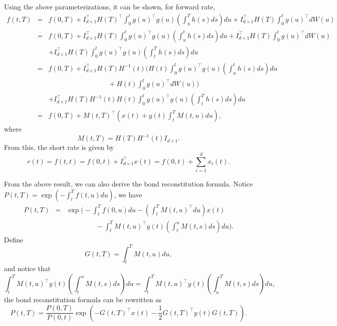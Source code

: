 \documentclass[12pt]{article}
\begin{document}
  Using the above parameterizations, it can be shown, for forward rate,
  \begin{eqnarray}
    f(t,T) &=& f(0,T)+I_{d\times 1}^{\top}H(T)^{\top}\int_0^tg(u)^{\top}g(u)\left(\int_u^Th(s)ds\right)du
              +I_{d\times 1}^{\top}H(T)\int_0^tg(u)^{\top}dW(u)\nonumber\\
           &=& f(0,T)+I_{d\times 1}^{\top}H(T)\int_0^tg(u)^{\top}g(u)\left(\int_u^th(s)ds\right)du
              +I_{d\times 1}^{\top}H(T)\int_0^tg(u)^{\top}dW(u)\nonumber\\
           && + I_{d\times 1}^{\top}H(T)\int_0^tg(u)^{\top}g(u)\left(\int_t^Th(s)ds\right)du\nonumber\\
           &=& f(0,T)+I_{d\times 1}^{\top}H(T)H^{-1}(t)\Big(H(t)\int_0^tg(u)^{\top}g(u)\left(\int_u^th(s)ds\right)du\nonumber\\
           &&\ \ \ \ \ \ \ \ \ \ \ \ \ \ \ \ \ \ \ \ \ \ \ \ \ \ \ \ \ \ \ \ \ \ \ \ \ \ \ +H(t)\int_0^tg(u)^{\top}dW(u)\Big)\nonumber\\
           && + I_{d\times 1}^{\top}H(T)H^{-1}(t)H(t)\int_0^tg(u)^{\top}g(u)\left(\int_t^Th(s)ds\right)du\nonumber\\
           &=& f(0,T)+M(t,T)^{\top}\left(x(t)+y(t)\int_t^TM(t,u)du\right),
  \end{eqnarray}
  where
  \begin{equation}
    M(t,T)=H(T)H^{-1}(t)I_{d\times 1}.
  \end{equation}
  From this, the short rate is given by
  \begin{equation}
    r(t)=f(t,t)=f(0,t)+I_{d\times 1}^{\top}x(t)=f(0,t)+\sum_{i=1}^dx_i(t).
  \end{equation}


  From the above result, we can also derive the bond reconstitution formula. Notice $P(t,T)=\exp\left(-\int_t^Tf(t,u)du\right)$, we have
  \begin{eqnarray}
    P(t,T)&=&\exp\Bigg(-\int_t^Tf(0,u)du-\left(\int_t^TM(t,u)^{\top}du\right)x(t) \nonumber\\
          &&\ \ \ \ \ \ \ \ \ \ \ \ \ \ \ \ \ \ \ -\int_t^TM(t,u)^{\top}y(t)\left(\int_t^uM(t,s)ds\right)du\Bigg).
  \end{eqnarray}
  Define
  \begin{equation}
    G(t,T)=\int_t^TM(t,u)du,
  \end{equation}
  and notice that
  \begin{equation}
    \int_t^TM(t,u)^{\top}y(t)\left(\int_t^uM(t,s)ds\right)du = \int_t^TM(t,u)^{\top}y(t)\left(\int_u^TM(t,s)ds\right)du,
  \end{equation}
  the bond reconstitution formula can be rewritten as
  \begin{equation}
    P(t,T)=\frac{P(0,T)}{P(0,t)}\exp\left(-G(t,T)^{\top}x(t)-\frac{1}{2}G(t,T)^{\top}y(t)G(t,T)\right).
    \label{reconstitution}
  \end{equation}
\end{document}
